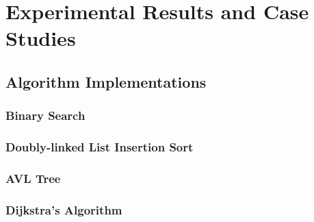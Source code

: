 \documentclass[conference]{IEEEtran}
\begin{document}
\begin{comment}
Given a mutant of program $P$, $M_i$, the 

Even a killed mutant (e.g., a mutant the harness detects) can shed
critical light on harness vulnerabilities.  For example, the code in
Figure \ref{fig:mergeharness} is a portion of a harness to verify
code that merges two sorted arrays, removing all duplicates (the
source arrays may contain duplicates or shared items, the output array
is guaranteed to be sorted and have all-unique values).  This harness
detects all non-equivalent mutants of the source code.  However, as is
well known, many software faults \cite{justmutants} are not
represented by a mutant.  Because we are model checking, we want our
harness to actually rule out \emph{all} bad runs of the program under
test.  Even a killed mutant's passing executions may show such a
problem.  Here we see that when the output array's size is 1, the way
we have written the duplicate check in fact \emph{assume}s away
\emph{all executions}!  We check no properties of size 1 output
arrays, and a fault that only appears with size = 1 will never be
detected.  No mutant produces such behavior, but noting an incorrect
but passing trace of this run lets us see the problem.
\end{comment}

\section{Experimental Results and Case Studies}

\subsection{Algorithm Implementations}

\subsubsection{Binary Search}

\subsubsection{Doubly-linked List Insertion Sort}

\subsubsection{AVL Tree}

\subsubsection{Dijkstra's Algorithm}
\end{document}
